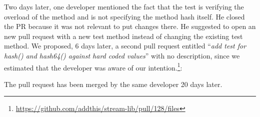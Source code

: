 Two days later, one developer mentioned the fact that the test is verifying the overload of the method and is not specifying the method hash itself. He closed the PR because it was not relevant to put changes there. He suggested to open an new pull request with a new test method instead of changing the existing test method. We proposed, 6 days later, a second pull request entitled ``\emph{add test for hash() and hash64() against hard coded values}'' with no description, since we estimated that the developer was aware of our intention.\footnote{\url{https://github.com/addthis/stream-lib/pull/128/files}}:
\begin{figure}[H]
	\centering{}
\end{figure}

The pull request has been merged by the same developer 20 days later.


